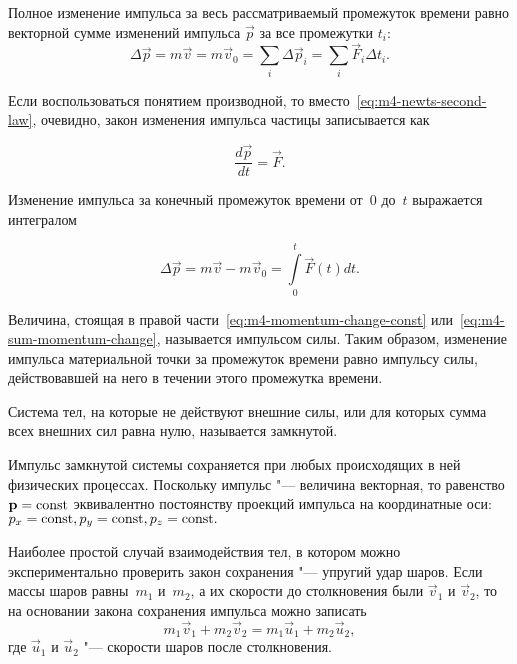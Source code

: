 \documentclass[a4paper, 12pt]{extarticle}
\newcommand{\issum}{\sum\limits_{i}}
\begin{document}
Полное изменение импульса за весь рассматриваемый промежуток времени равно векторной сумме изменений импульса $\vec p$ за все промежутки $t_i$:
\begin{equation}
\label{eq:m4-sum-momentum-change}
\Delta \vec p = m \vec v = m \vec v_0 = \issum \Delta \vec p_i = \issum \vec F_i \Delta t_i.
\end{equation}

Если воспользоваться понятием производной, то вместо~\eqref{eq:m4-newts-second-law}, очевидно, закон изменения импульса частицы записывается как

\begin{equation}
\label{eq:m4-momentum-change-via-drvt}
\frac{d \vec p}{d t} = \vec F .
\end{equation}

Изменение импульса за конечный промежуток времени от~0 до~$t$ выражается интегралом

\begin{equation}
\label{eq:m4-total-momentum-change-via-int}
\Delta \vec p = m \vec v - m \vec v_0 = \int\limits_0^t \vec F\left(t\right) d t.
\end{equation}

Величина, стоящая в правой части~\eqref{eq:m4-momentum-change-const} или~\eqref{eq:m4-sum-momentum-change}, называется импульсом силы. Таким образом, изменение импульса материальной точки за промежуток времени равно импульсу силы, действовавшей на него в течении этого промежутка времени.

Система тел, на которые не действуют внешние силы, или для которых сумма всех внешних сил равна нулю, называется замкнутой.

Импульс замкнутой системы сохраняется при любых происходящих в ней физических процессах. Поскольку импульс "--- величина векторная, то равенство~$\mathbf{p} = \textrm{const}$ эквивалентно постоянству проекций импульса на координатные оси: $p_x = \textrm{const}, p_y = \textrm{const}, p_z = \textrm{const}.$  %

Наиболее простой случай взаимодействия тел, в котором можно экспериментально проверить закон сохранения "--- упругий удар шаров. Если массы шаров равны~$m_1$ и~$m_2$, а их скорости до столкновения были $\vec v_1$ и $\vec v_2$, то на основании закона сохранения импульса можно записать
\begin{equation}
\label{eq:m4-balls-collision}
m_1 \vec v_1 + m_2 \vec v_2 = m_1 \vec u_1 + m_2 \vec u_2,
\end{equation}
где $\vec u_1$ и $\vec u_2$ "--- скорости шаров после столкновения.
\end{document}
